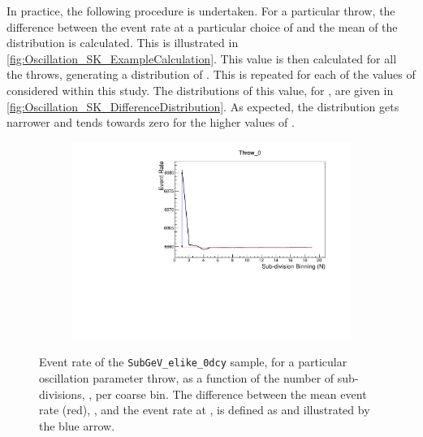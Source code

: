 In practice, the following procedure is undertaken. For a particular throw, the difference between the event rate at a particular choice of  and the mean of the distribution is calculated. This is illustrated in \autoref{fig:Oscillation_SK_ExampleCalculation}. This value is then calculated for all the  throws, generating a distribution of . This is repeated for each of the values of  considered within this study. The distributions of this value, for , are given in \autoref{fig:Oscillation_SK_DifferenceDistribution}. As expected, the distribution gets narrower and tends towards zero for the higher values of . 

\begin{figure}[h]                                                                                                                                                                                          
  \begin{subfigure}[t]{\textwidth}
    \includegraphics[width=\textwidth, trim={0mm 0mm 0mm 0mm}, clip,page=1]{Figures/Oscillation/ExampleCalculation.pdf}
  \end{subfigure}
  \caption{Event rate of the \texttt{SubGeV\_elike\_0dcy} sample, for a particular oscillation parameter throw, as a function of the number of sub-divisions, , per coarse bin. The difference between the mean event rate (red), \quickmath{\bar{\lambda}}, and the event rate at ,  is defined as  and illustrated by the blue arrow.}
  \label{fig:Oscillation_SK_ExampleCalculation}
\end{figure}

